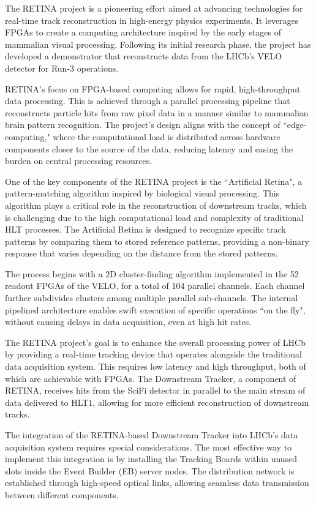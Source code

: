The RETINA project\cite{Lazzari:2801062} is a pioneering effort aimed at advancing technologies for real-time track reconstruction in high-energy physics experiments. It leverages FPGAs to create a computing architecture inspired by the early stages of mammalian visual processing. Following its initial research phase, the project has developed a demonstrator that reconstructs data from the LHCb's VELO detector for Run-3 operations.

RETINA's focus on FPGA-based computing allows for rapid, high-throughput data processing. This is achieved through a parallel processing pipeline that reconstructs particle hits from raw pixel data in a manner similar to mammalian brain pattern recognition. The project's design aligns with the concept of ``edge-computing," where the computational load is distributed across hardware components closer to the source of the data, reducing latency and easing the burden on central processing resources.

One of the key components of the RETINA project is the ``Artificial Retina"\cite{Ristori:2000vg}, a pattern-matching algorithm inspired by biological visual processing. This algorithm plays a critical role in the reconstruction of downstream tracks, which is challenging due to the high computational load and complexity of traditional HLT processes. The Artificial Retina is designed to recognize specific track patterns by comparing them to stored reference patterns, providing a non-binary response that varies depending on the distance from the stored patterns.

The process begins with a $2$D cluster-finding algorithm implemented in the 52 readout FPGAs of the VELO, for a total of 104 parallel channels. Each channel further subdivides clusters among multiple parallel sub-channels. The internal pipelined architecture enables swift execution of specific operations ``on the fly", without causing delays in data acquisition, even at high hit rates.

The RETINA project’s goal is to enhance the overall processing power of LHCb by providing a real-time tracking device that operates alongside the traditional data acquisition system. This requires low latency and high throughput, both of which are achievable with FPGAs. The Downstream Tracker, a component of RETINA, receives hits from the SciFi detector in parallel to the main stream of data delivered to HLT$1$, allowing for more efficient reconstruction of downstream tracks.

The integration of the RETINA-based Downstream Tracker into LHCb's data acquisition system requires special considerations\cite{Lazzari:2888549}. The most effective way to implement this integration is by installing the Tracking Boards within unused slots inside the Event Builder (EB) server nodes. The distribution network is established through high-speed optical links, allowing seamless data transmission between different components.

